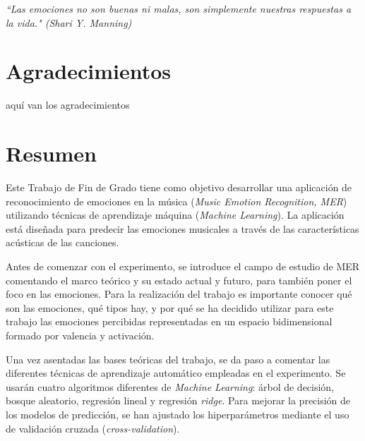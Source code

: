 \documentclass[12pt,a4paper,Spanish]{article}
\begin{document}
\newpage
\thispagestyle{empty} %
\begin{flushright}
	\vspace*{5cm}
 	\textit{“Las emociones no son buenas ni malas, son simplemente nuestras respuestas a la vida." (Shari Y. Manning)}
\end{flushright}





\newpage
\thispagestyle{plain}
\section*{Agradecimientos}
 

aquí van los agradecimientos









\newpage
\section*{Resumen}
Este Trabajo de Fin de Grado tiene como objetivo desarrollar una aplicación de reconocimiento de emociones en la música (\textit{Music Emotion Recognition, MER}) utilizando técnicas de aprendizaje máquina (\textit{Machine Learning}). La aplicación está diseñada para predecir las emociones musicales a través de las características acústicas de las canciones.
\newline

Antes de comenzar con el experimento, se introduce el campo de estudio de MER comentando el marco teórico y su estado actual y futuro, para también poner el foco en las emociones. Para la realización del trabajo es importante conocer qué son las emociones, qué tipos hay, y por qué se ha decidido utilizar para este trabajo las emociones percibidas representadas en un espacio bidimensional formado por valencia y activación.
\newline

Una vez asentadas las bases teóricas del trabajo, se da paso a comentar las diferentes técnicas de aprendizaje automático empleadas en el experimento. Se usarán cuatro algoritmos diferentes de \textit{Machine Learning}: árbol de decisión, bosque aleatorio, regresión lineal y regresión \textit{ridge}. Para mejorar la precisión de los modelos de predicción, se han ajustado los hiperparámetros mediante el uso de validación cruzada (\textit{cross-validation}). 
\newline
\end{document}
